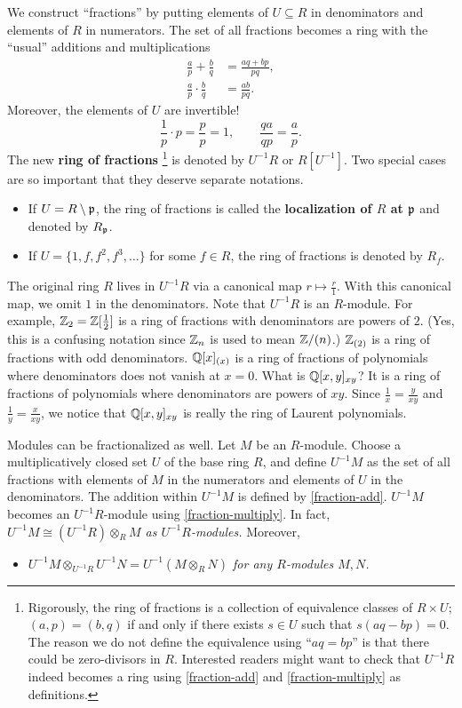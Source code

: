 We construct ``fractions'' by putting elements of $U \subseteq R$ in denominators
and elements of $R$ in numerators. The set of all fractions becomes a ring with the ``usual'' additions and multiplications
\begin{align}
 \frac{a}{p} + \frac{b}{q}    &= \frac{aq + bp}{pq}, \label{fraction-add} \\
\frac{a}{p} \cdot \frac{b}{q} &= \frac{ab}{pq}. \label{fraction-multiply}
\end{align}
Moreover, the elements of $U$ are invertible!
\[
 \frac{1}{p} \cdot p = \frac{p}{p} = 1, \quad \quad \frac{q a}{qp} = \frac{a}{p}.
\]
The new {\bf ring of fractions}%
\footnote{
Rigorously, the ring of fractions is a collection of equivalence classes of $R \times U$;
$(a,p) = (b,q)$ if and only if there exists $s \in U$ such that $s(aq-bp) = 0$.
The reason we do not define the equivalence using ``$aq=bp$'' is
that there could be zero-divisors in $R$.
Interested readers might want to check that 
$U^{-1}R$ indeed becomes a ring using \eqref{fraction-add} and \eqref{fraction-multiply} as definitions.
}
is denoted by $U^{-1}R$ or $R[U^{-1}]$.
Two special cases are so important that they deserve separate notations.
\begin{itemize}
 \item If $U = R \setminus \mathfrak{p}$, the ring of fractions is called the {\bf localization of $R$ at $\mathfrak{p}$} and denoted by $R_{\mathfrak{p}}$.
 \item If $U = \{1, f, f^2, f^3, \ldots\}$ for some $f \in R$, the ring of fractions is denoted by $R_f$.
\end{itemize}
The original ring $R$ lives in $U^{-1}R$ via a canonical map $r \mapsto \frac{r}{1}$.
With this canonical map, we omit $1$ in the denominators.
Note that $U^{-1}R$ is an $R$-module.
For example, $\mathbb{Z}_{2} = \mathbb{Z}[\frac{1}{2}]$ is a ring of fractions with denominators are powers of $2$.
(Yes, this is a confusing notation since $\mathbb{Z}_n$ is used to mean $\mathbb{Z}/(n)$.)
$\mathbb{Z}_{(2)}$ is a ring of fractions with odd denominators.
$\mathbb{Q}[x]_{(x)}$ is a ring of fractions of polynomials where denominators does not vanish at $x=0$.
What is $\mathbb{Q}[x,y]_{xy}$? It is a ring of fractions of polynomials where denominators are powers of $xy$.
Since $\frac{1}{x} = \frac{y}{xy}$ and $\frac{1}{y} = \frac{x}{xy}$,
we notice that $\mathbb{Q}[x,y]_{xy}$ is really the ring of Laurent polynomials.


Modules can be fractionalized as well.
Let $M$ be an $R$-module.
Choose a multiplicatively closed set $U$ of the base ring $R$,
and define $U^{-1}M$ as the set of all fractions with elements of $M$ in the numerators and elements of $U$ in the denominators.
The addition within $U^{-1}M$ is defined by \eqref{fraction-add}.
$U^{-1}M$ becomes an $U^{-1}R$-module using \eqref{fraction-multiply}.
In fact, {\em $ U^{-1}M \cong (U^{-1}R) \otimes_R M $ as $U^{-1}R$-modules.} Moreover,
\begin{itemize}
\item {\em $U^{-1}M \otimes_{U^{-1}R} U^{-1}N = U^{-1}( M \otimes_R N)$ for any $R$-modules $M,N$.}
\end{itemize}




